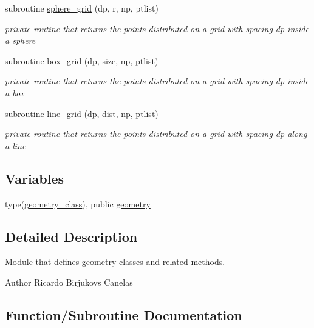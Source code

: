 \begin{DoxyCompactItemize}
subroutine \mbox{\hyperlink{namespacegeometry__mod_a6c03a4ea3de6763940396dbeb3908ebc}{sphere\+\_\+grid}} (dp, r, np, ptlist)
\begin{DoxyCompactList}\small\item\em private routine that returns the points distributed on a grid with spacing dp inside a sphere \end{DoxyCompactList}\item 
subroutine \mbox{\hyperlink{namespacegeometry__mod_ae87e4ecff2d21a839da2b82919b5fd0b}{box\+\_\+grid}} (dp, size, np, ptlist)
\begin{DoxyCompactList}\small\item\em private routine that returns the points distributed on a grid with spacing dp inside a box \end{DoxyCompactList}\item 
subroutine \mbox{\hyperlink{namespacegeometry__mod_abcb09c0f5274c27cb79b0dd009ed94b3}{line\+\_\+grid}} (dp, dist, np, ptlist)
\begin{DoxyCompactList}\small\item\em private routine that returns the points distributed on a grid with spacing dp along a line \end{DoxyCompactList}\end{DoxyCompactItemize}
\subsection*{Variables}
\begin{DoxyCompactItemize}
\item 
type(\mbox{\hyperlink{structgeometry__mod_1_1geometry__class}{geometry\+\_\+class}}), public \mbox{\hyperlink{namespacegeometry__mod_ad2ad4f7e1138beaad5f37d5c15b7b457}{geometry}}
\end{DoxyCompactItemize}


\subsection{Detailed Description}
Module that defines geometry classes and related methods. 

\begin{DoxyAuthor}{Author}
Ricardo Birjukovs Canelas 
\end{DoxyAuthor}


\subsection{Function/\+Subroutine Documentation}
\mbox{\label{namespacegeometry__mod_a1b6f259b0b6be71e02ffae7670f7d8ba}} 
